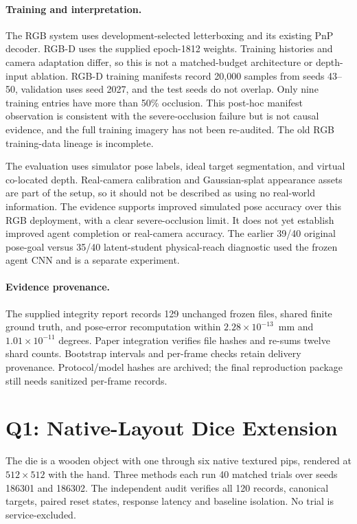 \paragraph{Training and interpretation.}
The RGB system uses development-selected letterboxing and its existing PnP decoder. RGB-D uses the supplied epoch-1812 weights. Training histories and camera adaptation differ, so this is not a matched-budget architecture or depth-input ablation. RGB-D training manifests record 20,000 samples from seeds 43--50, validation uses seed 2027, and the test seeds do not overlap. Only nine training entries have more than 50\% occlusion. This post-hoc manifest observation is consistent with the severe-occlusion failure but is not causal evidence, and the full training imagery has not been re-audited. The old RGB training-data lineage is incomplete.

The evaluation uses simulator pose labels, ideal target segmentation, and virtual co-located depth. Real-camera calibration and Gaussian-splat appearance assets are part of the setup, so it should not be described as using no real-world information. The evidence supports improved simulated pose accuracy over this RGB deployment, with a clear severe-occlusion limit. It does not yet establish improved agent completion or real-camera accuracy. The earlier 39/40 original pose-goal versus 35/40 latent-student physical-reach diagnostic used the frozen agent CNN and is a separate experiment.

\paragraph{Evidence provenance.}
The supplied integrity report records 129 unchanged frozen files, shared finite ground truth, and pose-error recomputation within $2.28\times10^{-13}$~mm and $1.01\times10^{-11}$ degrees. Paper integration verifies file hashes and re-sums twelve shard counts. Bootstrap intervals and per-frame checks retain delivery provenance. Protocol/model hashes are archived; the final reproduction package still needs sanitized per-frame records.

\section{Q1: Native-Layout Dice Extension}
\label{sec:dice-extension}
The die is a wooden object with one through six native textured pips, rendered at $512\times512$ with the hand. Three methods each run 40 matched trials over seeds 186301 and 186302. The independent audit verifies all 120 records, canonical targets, paired reset states, response latency and baseline isolation. No trial is service-excluded.

